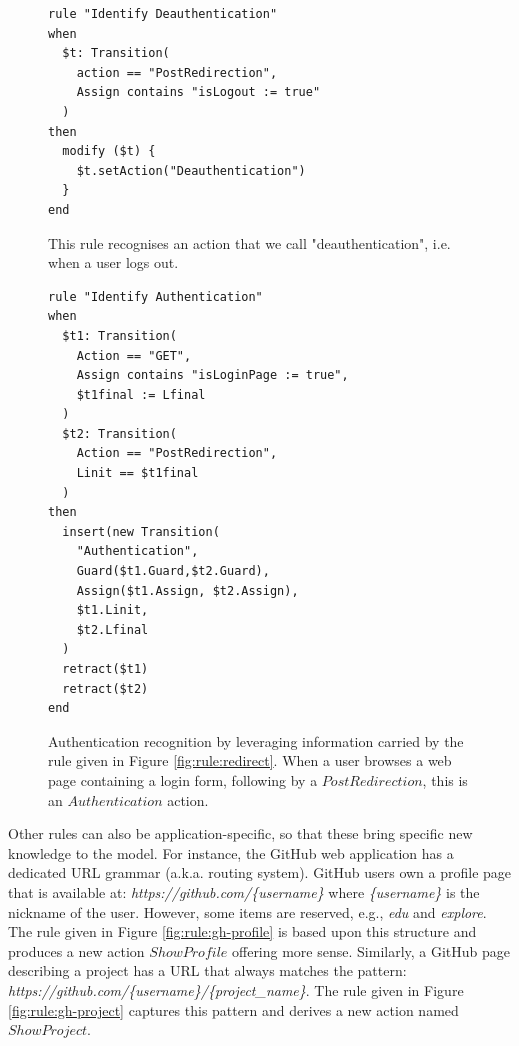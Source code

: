 \begin{figure}[h]
\begin{framed}
\begin{BVerbatim}
rule "Identify Deauthentication"
when
  $t: Transition(
    action == "PostRedirection",
    Assign contains "isLogout := true"
  )
then
  modify ($t) {
    $t.setAction("Deauthentication")
  }
end
\end{BVerbatim}
\end{framed}

    \caption{This rule recognises an action that we call
    "deauthentication", i.e. when a user logs out.}
    \label{fig:rule:deauth}
\end{figure}

\begin{figure}[h]
\begin{framed}
\begin{BVerbatim}
rule "Identify Authentication"
when
  $t1: Transition(
    Action == "GET",
    Assign contains "isLoginPage := true",
    $t1final := Lfinal
  )
  $t2: Transition(
    Action == "PostRedirection",
    Linit == $t1final
  )
then
  insert(new Transition(
    "Authentication",
    Guard($t1.Guard,$t2.Guard),
    Assign($t1.Assign, $t2.Assign),
    $t1.Linit,
    $t2.Lfinal
  )
  retract($t1)
  retract($t2)
end
\end{BVerbatim}
\end{framed}

    \caption{Authentication recognition by leveraging information
    carried by the rule given in Figure \ref{fig:rule:redirect}.
    When a user browses a web page containing a login form,
    following by a $PostRedirection$, this is an $Authentication$
    action.}
    \label{fig:rule:auth}
\end{figure}

Other rules can also be application-specific, so that these bring
specific new knowledge to the model. For instance, the GitHub web
application has a dedicated URL grammar (a.k.a. routing system).
GitHub users own a profile page that is available at:
\textit{https://github.com/\{username\}} where \textit{\{username\}}
is the nickname of the user. However, some items are reserved,
e.g., \textit{edu} and \textit{explore}. The rule given in Figure
\ref{fig:rule:gh-profile} is based upon this structure and
produces a new action $ShowProfile$ offering more sense.
Similarly, a GitHub page describing a project has a URL that
always matches the pattern:
\textit{https://github.com/\{username\}/\{project\_name\}}. The
rule given in Figure \ref{fig:rule:gh-project} captures this
pattern and derives a new action named $ShowProject$.

